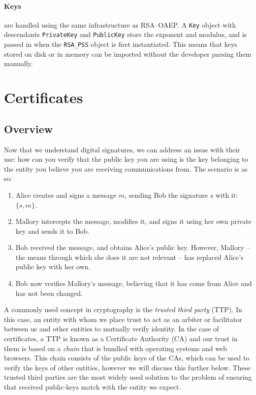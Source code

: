     \paragraph{Keys} are handled using the same infrastructure as RSA--OAEP. A \verb!Key! object with descendants \verb!PrivateKey! and \verb!PublicKey! store the exponent and modulus, and is passed in when the \verb!RSA_PSS! object is first instantiated. This means that keys stored on disk or in memory can be imported without the developer parsing them manually.

\section{Certificates}
\label{sec:certs}

  \subsection{Overview}
  
  Now that we understand digital signatures, we can address an issue with their use: how can you verify that the public key you are using is the key belonging to the entity you believe you are receiving communications from. The scenario is as so: 
  
  \begin{enumerate}
    \item Alice creates and signs a message $m$, sending Bob the signature $s$ with it: $\{s,m\}$.
    \item Mallory intercepts the message, modifies it, and signs it using her own private key and sends it to Bob.
    \item Bob received the message, and obtains Alice's public key. However, Mallory -- the means through which she does it are not relevant -- has replaced Alice's public key with her own.
    \item Bob now verifies Mallory's message, believing that it has come from Alice and has not been changed.
  \end{enumerate}
  
  A commonly used concept in cryptography is the \emph{trusted third party} (TTP). In this case, an entity with whom we place trust to act as an arbiter or facilitator between us and other entities to mutually verify identity. In the case of certificates, a TTP is known as a Certificate Authority (CA) and our trust in them is based on a \emph{chain} that is bundled with operating systems and web browsers. This chain consists of the public keys of the CAs, which can be used to verify the keys of other entities, however we will discuss this further below. These trusted third parties are the most widely used solution to the problem of ensuring that received public-keys match with the entity we expect.
  
